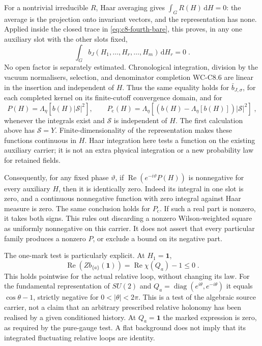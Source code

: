 \documentclass[11pt]{article}
\newcommand{\dd}{\mathrm{d}}
\newcommand{\id}{\mathbf 1}
\begin{document}
For a nontrivial irreducible $R$, Haar averaging gives
$\int_G R(H)\,\dd H=0$: the average is the projection onto invariant
vectors, and the representation has none. Applied inside the closed
trace in \eqref{eq:c8-fourth-bare}, this proves, in any one auxiliary
slot with the other slots fixed,
\begin{equation}\label{eq:c8-fourth-haar-zero}
    \int_G b_J(H_1,\ldots,H_r,\ldots,H_m)\,\dd H_r=0\;.
\end{equation}
No open factor is separately estimated. Chronological integration,
division by the vacuum normalisers, selection, and denominator
completion WC-C8.6 are linear in the insertion and independent of
$H$. Thus the same equality holds for $\bar b_{J,\sigma}$, for each
completed kernel on its finite-cutoff convergence domain, and for
\begin{equation}\label{eq:c8-fourth-zero-square}
    P(H)=\Lambda_\eta[b(H)|\mathcal S|^2],\qquad
    P_{\mathrm c}(H)=\Lambda_\eta[(b(H)-\Lambda_\eta[b(H)])
        |\mathcal S|^2]\;,
\end{equation}
whenever the integrals exist and $\mathcal S$ is independent of $H$.
The first calculation above has $\mathcal S=Y$. Finite-dimensionality
of the representation makes these functions continuous in $H$.
Haar integration here tests a function on the existing auxiliary
carrier; it is not an extra physical integration or a new probability
law for retained fields.

Consequently, for any fixed phase $\vartheta$, if
$\operatorname{Re}(e^{-i\vartheta}P(H))$ is nonnegative for every
auxiliary $H$, then it is identically zero. Indeed its integral in one
slot is zero, and a continuous nonnegative function with zero integral
against Haar measure is zero. The same conclusion holds for $P_{\mathrm c}$.
If such a real part is nonzero, it takes both signs. This rules out
discarding a nonzero Wilson-weighted square as uniformly nonnegative
on this carrier. It does not assert that every particular family
produces a nonzero $P$, or exclude a bound on its negative part.

The one-mark test is particularly explicit. At $H_1=\id$,
\begin{equation}\label{eq:c8-fourth-one-mark}
    \operatorname{Re}(Zb_{\{a\}}(\id))
        =\operatorname{Re}\chi(Q_a)-1\leq0\;.
\end{equation}
This holds pointwise for the actual relative loop, without changing its
law. For the fundamental representation of $SU(2)$ and
$Q_a=\operatorname{diag}(e^{i\theta},e^{-i\theta})$ it equals
$\cos\theta-1$, strictly negative for $0<|\theta|<2\pi$.
This is a test of the algebraic source carrier, not a claim that an
arbitrary prescribed relative holonomy has been realised by a given
conditioned history. At $Q_a=\id$ the marked expression is zero, as
required by the pure-gauge test. A flat background does not imply
that its integrated fluctuating relative loops are identity.
\end{document}
